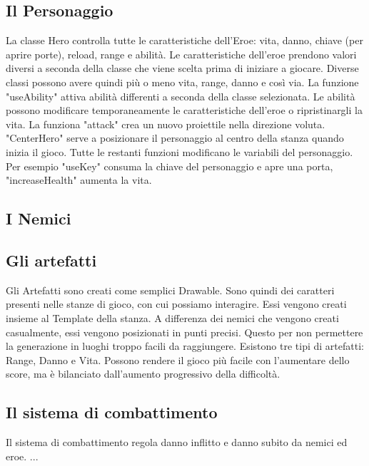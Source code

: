 \documentclass[12pt]{article}
\begin{document}
\subsection*{Il Personaggio}
La classe Hero controlla tutte le caratteristiche dell'Eroe: vita, danno, chiave (per aprire porte), reload, range e abilità.
Le caratteristiche dell'eroe prendono valori diversi a seconda della classe che viene scelta prima di iniziare a giocare. Diverse classi possono avere quindi più o meno vita, range, danno e così via.
La funzione "useAbility" attiva abilità differenti a seconda della classe selezionata.
Le abilità possono modificare temporaneamente le caratteristiche dell'eroe o ripristinargli la vita.
La funziona "attack" crea un nuovo proiettile nella direzione voluta. "CenterHero" serve a posizionare il personaggio al centro della stanza quando inizia il gioco. 
Tutte le restanti funzioni modificano le variabili del personaggio. Per esempio "useKey" consuma la chiave del personaggio e apre una porta, "increaseHealth" aumenta la vita.


\subsection*{I Nemici}

\subsection*{Gli artefatti}
Gli Artefatti sono creati come semplici Drawable. Sono quindi dei caratteri presenti nelle stanze di gioco, con cui possiamo interagire. Essi vengono creati insieme al Template della stanza. A differenza dei nemici che vengono creati casualmente, essi vengono posizionati in punti precisi. Questo per non permettere la generazione in luoghi troppo facili da raggiungere.
Esistono tre tipi di artefatti: Range, Danno e Vita.
Possono rendere il gioco più facile con l'aumentare dello score, ma è bilanciato dall'aumento progressivo della difficoltà.

\subsection*{Il sistema di combattimento}
Il sistema di combattimento regola danno inflitto e danno subito da nemici ed eroe. 
...
\end{document}
